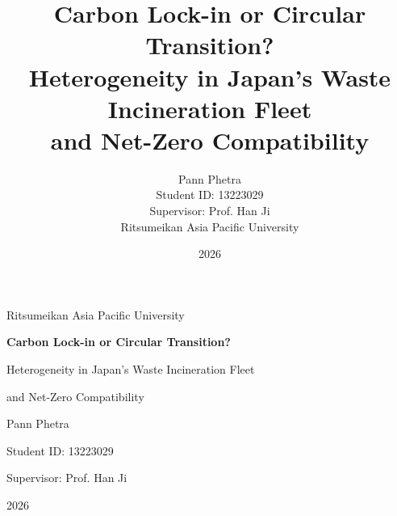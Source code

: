 \documentclass[12pt,a4paper]{article}
\title{%
  Carbon Lock-in or Circular Transition?\\
  Heterogeneity in Japan's Waste Incineration Fleet\\
  and Net-Zero Compatibility%
}
\author{Pann Phetra \\ Student ID: 13223029 \\ Supervisor: Prof. Han Ji \\ Ritsumeikan Asia Pacific University}
\date{2026}
\begin{document}

\begin{titlepage}
\thispagestyle{empty}
\begin{center}
\vspace*{1.5cm}
{\Large Ritsumeikan Asia Pacific University\par}

\vfill

{\LARGE\bfseries Carbon Lock-in or Circular Transition?\par}
\vspace{0.5cm}
{\Large Heterogeneity in Japan's Waste Incineration Fleet\par}
\vspace{0.2cm}
{\Large and Net-Zero Compatibility\par}

\vfill

{\large Pann Phetra\par}
\vspace{0.5cm}
{\large Student ID: 13223029\par}
\vspace{0.5cm}
{\large Supervisor: Prof. Han Ji\par}

\vfill

{\large 2026\par}
\end{center}
\end{titlepage}
\clearpage
{}
\end{document}
